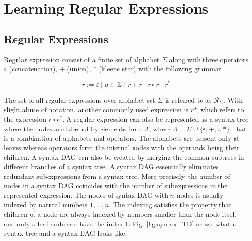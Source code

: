 \chapter{Learning Regular Expressions}

\label{subsec:regex-def}

\section{Regular Expressions}

Regular expression consist of a finite set of alphabet $\Sigma$ along with three operators $\circ$ (concatenation), $+$ (union), $*$ (kleene star) with the following grammar

$$r:=\varepsilon \mid a\in \Sigma \mid r+r \mid r\circ r \mid r^*$$

The set of all regular expressions over alphabet set $\Sigma$ is referred to as $\mathcal{R}_{\Sigma}$. With slight abuse of notation, another commonly used expression is $r^+$ which refers to the expression $r\circ r^*$. A regular expression can also be represented as a syntax tree where the nodes are labelled by elements from $\Lambda$, where $\Lambda=\Sigma \cup \{\varepsilon, +,\circ,*\}$, that is a combination of alphabets and operators. The alphabets are present only at leaves whereas operators form the internal nodes with the operands being their children.
A syntax DAG can also be created by merging the common subtrees in different branches of a syntax tree. A syntax DAG essentially eliminates redundant subexpressions from a syntax tree. More precisely, the number of nodes in a syntax DAG coincides with the number of subexpressions in the represented expression. The nodes of syntax DAG with $n$ nodes is usually indexed by natural numbers $1,\ldots, n$. The indexing satisfies the property that children of a node are always indexed by numbers smaller than the node itself and only a leaf node can have the index 1. Fig. \ref{fig:syntax_TD} shows what a syntax tree and a syntax DAG looks like. 

